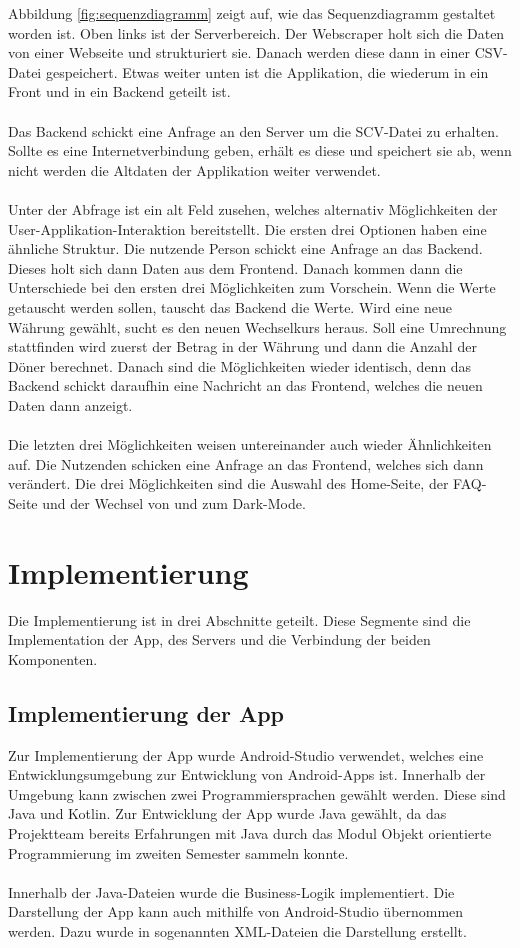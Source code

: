 \documentclass[conference]{IEEEtran}
\begin{document}
\noindent
Abbildung \ref{fig:sequenzdiagramm} zeigt auf, wie das Sequenzdiagramm gestaltet worden ist. Oben links ist der Serverbereich. Der Webscraper holt sich die Daten von einer Webseite und strukturiert sie. Danach werden diese dann in einer CSV-Datei gespeichert. Etwas weiter unten ist die Applikation, die wiederum in ein Front und in ein Backend geteilt ist. \\\\ Das Backend schickt eine Anfrage an den Server um die SCV-Datei zu erhalten. Sollte es eine Internetverbindung geben, erhält es diese und speichert sie ab, wenn nicht werden die Altdaten der Applikation weiter verwendet. \\\\ Unter der Abfrage ist ein alt Feld zusehen, welches alternativ Möglichkeiten der User-Applikation-Interaktion bereitstellt. Die ersten drei Optionen haben eine ähnliche Struktur. Die nutzende Person schickt eine Anfrage an das Backend. Dieses holt sich dann Daten aus dem Frontend. Danach kommen dann die Unterschiede bei den ersten drei Möglichkeiten zum Vorschein. Wenn die Werte getauscht werden sollen, tauscht das Backend die Werte. Wird eine neue Währung gewählt, sucht es den neuen Wechselkurs heraus. Soll eine Umrechnung stattfinden wird zuerst der Betrag in der Währung und dann die Anzahl der Döner berechnet. Danach sind die Möglichkeiten wieder identisch, denn das Backend schickt daraufhin eine Nachricht an das Frontend, welches die neuen Daten dann anzeigt. \\\\ Die letzten drei Möglichkeiten weisen untereinander auch wieder Ähnlichkeiten auf. Die Nutzenden schicken eine Anfrage an das Frontend, welches sich dann verändert. Die drei Möglichkeiten sind die Auswahl des Home-Seite, der FAQ-Seite und der Wechsel von und zum Dark-Mode.

\section{Implementierung}
Die Implementierung ist in drei Abschnitte geteilt. Diese Segmente sind die Implementation der App, des Servers und die Verbindung der beiden Komponenten.

\subsection{Implementierung der App}
Zur Implementierung der App wurde Android-Studio verwendet, welches eine Entwicklungsumgebung zur Entwicklung von Android-Apps ist. Innerhalb der Umgebung kann zwischen zwei Programmiersprachen gewählt werden. Diese sind Java und Kotlin. Zur Entwicklung der App wurde Java gewählt, da das Projektteam bereits Erfahrungen mit Java  durch das Modul Objekt orientierte Programmierung im zweiten Semester sammeln konnte. \\\\ Innerhalb der Java-Dateien wurde die Business-Logik implementiert. Die Darstellung der App kann auch mithilfe von Android-Studio übernommen werden. Dazu wurde in sogenannten XML-Dateien die Darstellung erstellt.
\end{document}
